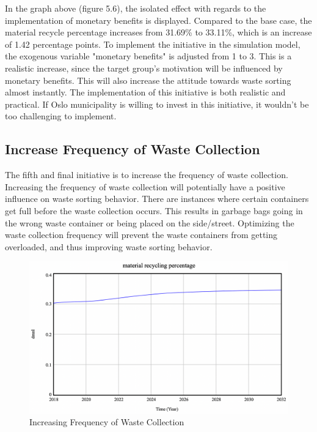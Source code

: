 \indent \newline
In the graph above (figure 5.6), the isolated effect with regards to the implementation of monetary benefits is displayed. Compared to the base case, the material recycle percentage increases from 31.69\% to 33.11\%, which is an increase of 1.42 percentage points. To implement the initiative in the simulation model, the exogenous variable "monetary benefits" is adjusted from 1 to 3. This is a realistic increase, since the target group's motivation will be influenced by monetary benefits. This will also increase the attitude towards waste sorting almost instantly. The implementation of this initiative is both realistic and practical. If Oslo municipality is willing to invest in this initiative, it wouldn't be too challenging to implement. 

\subsection{Increase Frequency of Waste Collection}


\indent \newline
The fifth and final initiative is to increase the frequency of waste collection. Increasing the frequency of waste collection will potentially have a positive influence on waste sorting behavior. There are instances where certain containers get full before the waste collection occurs. This results in garbage bags going in the wrong waste container or being placed on the side/street. Optimizing the waste collection frequency will prevent the waste containers from getting overloaded, and thus improving waste sorting behavior.  

\begin{figure}[H]
\centering
\includegraphics [scale=0.28,angle=360]{figures/frequencyinitiative.png}
\caption{Increasing Frequency of Waste Collection}
\label{fig:frequencyinitiative}
\end{figure}

